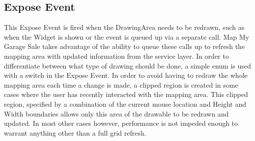 \documentclass{report}
\begin{document}
\subsection{Expose Event}
This Expose Event is fired when the DrawingArea needs to be redrawn, such as when the Widget
is shown or the event is queued up via a separate call. Map My Garage Sale takes advantage of
the ability to queue these calls up to refresh the mapping area with updated information from the 
service layer. In order to differentiate between what type of drawing should be done, a simple
enum is used with a switch in the Expose Event. In order to avoid having to redraw the whole
mapping area each time a change is made, a clipped region is created in some cases where the user
has recently interacted with the mapping area. This clipped region, specified by a combination
of the current mouse location and Height and Width boundaries allows only this area of the 
drawable to be redrawn and updated.  In most other cases however, performance is not impeded 
enough to warrant anything other than a full grid refresh.
\end{document}
